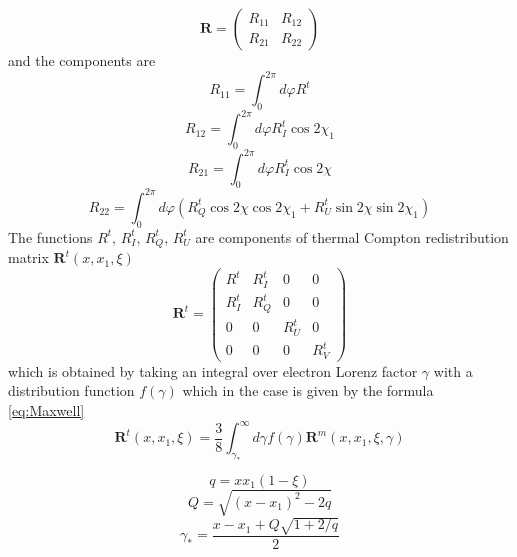 \documentclass[iop, usenatbib]{emulateapj}
\newcommand{\be}{\begin{equation}}
\newcommand{\ee}{\end{equation}}
\begin{document}
\be
\bm{R}=
\left( {\begin{array}{cc}
    R_{11} & R_{12}  \\
    R_{21} & R_{22}  
    \end{array} } \right)
\ee
and the components are
$$
R_{11}=\int_0^{2\pi} d\varphi R^t 
$$$$
R_{12}=\int_0^{2\pi} d\varphi R^t_I\cos2\chi_1 
$$$$
R_{21}=\int_0^{2\pi} d\varphi R^t_I\cos2\chi 
$$$$
R_{22}=\int_0^{2\pi} d\varphi (R^t_Q\cos2\chi\cos2\chi_1 + R^t_U \sin2\chi\sin2\chi_1)
$$
The functions $R^t,\,R^t_I,\,R^t_Q,\,R^t_U$ are components of thermal Compton redistribution matrix $\bm{R}^t(x,x_1,\xi)$ 
\be
\bm{R}^t= 
\left( {\begin{array}{cccc}
    R^t & R^t_I & 0 & 0 \\
     R^t_I &  R^t_Q & 0 & 0 \\
    0 & 0 &  R^t_U & 0 \\
    0 & 0 & 0 &  R^t_V  
   \end{array} } \right)
\ee
which is obtained by taking an integral over electron Lorenz factor $\gamma$ with a distribution function $f(\gamma)$ which
in the case is given by the formula \eqref{eq:Maxwell}
\be
\bm{R}^t(x,x_1,\xi)=\frac38\int_{\gamma_*}^\infty d\gamma
f(\gamma)\bm{R}^m(x,x_1,\xi,\gamma)
\ee

$$
q=xx_1(1-\xi)$$$$
Q=\sqrt{(x-x_1)^2-2q}
$$
\be
\gamma_*=\frac{x-x_1+Q\sqrt{1+2/q}}2
\ee
\end{document}
